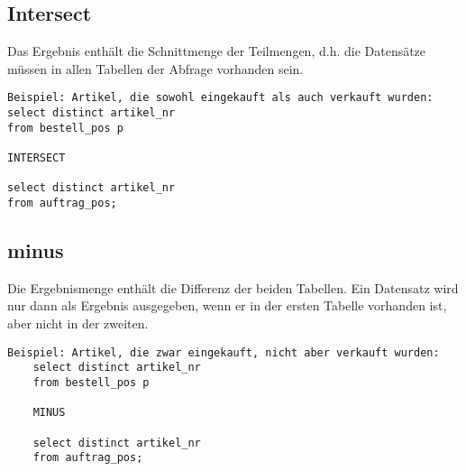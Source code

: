 \documentclass[fleqn,10pt]{SelfArx} %
\begin{document}
\subsection{Intersect}
Das Ergebnis enthält die Schnittmenge der Teilmengen, d.h. die Datensätze müssen in allen Tabellen der Abfrage vorhanden sein. 
\begin{verbatim}
Beispiel: Artikel, die sowohl eingekauft als auch verkauft wurden:
select distinct artikel_nr
from bestell_pos p

INTERSECT

select distinct artikel_nr
from auftrag_pos;
\end{verbatim}

\subsection{minus}
Die Ergebnismenge enthält die Differenz der beiden Tabellen. Ein Datensatz wird nur dann als Ergebnis ausgegeben, wenn er in der ersten Tabelle vorhanden ist, aber nicht in der zweiten. 
\begin{verbatim}
Beispiel: Artikel, die zwar eingekauft, nicht aber verkauft wurden:  
	select distinct artikel_nr
	from bestell_pos p
	
	MINUS
	
	select distinct artikel_nr
	from auftrag_pos; 
\end{verbatim}








%
\end{document}
